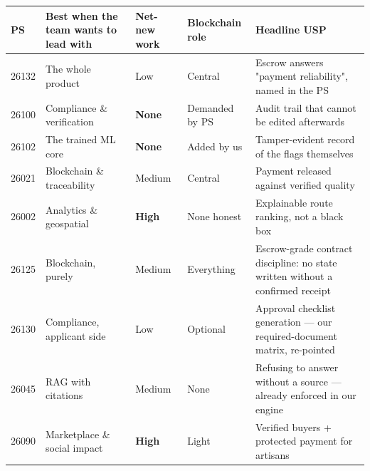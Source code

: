 \documentclass[11pt]{article}
\begin{document}
\renewcommand{\arraystretch}{1.5}
\noindent\begin{tabular}{@{}p{1.2cm}p{3.6cm}p{2.3cm}p{2.6cm}p{5.6cm}@{}}
\toprule
\textbf{PS} & \textbf{Best when the team wants to lead with} & \textbf{Net-new work} & \textbf{Blockchain role} & \textbf{Headline USP} \\
\midrule
\rowcolor{gxteal!10}
26132 & The whole product & Low & Central & Escrow answers "payment reliability", named in the PS \\
26100 & Compliance \& verification & \textbf{None} & Demanded by PS & Audit trail that cannot be edited afterwards \\
26102 & The trained ML core & \textbf{None} & Added by us & Tamper-evident record of the flags themselves \\
26021 & Blockchain \& traceability & Medium & Central & Payment released against verified quality \\
26002 & Analytics \& geospatial & \textbf{High} & \cellcolor{gxamber!12}None honest & Explainable route ranking, not a black box \\
26125 & Blockchain, purely & Medium & \cellcolor{gxviolet!12}Everything & Escrow-grade contract discipline: no state written without a confirmed receipt \\
\rowcolor{gxcyan!7}
26130 & Compliance, applicant side & Low & Optional & Approval checklist generation --- our required-document matrix, re-pointed \\
\rowcolor{gxcyan!7}
26045 & RAG with citations & Medium & None & Refusing to answer without a source --- already enforced in our engine \\
26090 & Marketplace \& social impact & \textbf{High} & Light & Verified buyers + protected payment for artisans \\
\bottomrule
\end{tabular}
\end{document}

